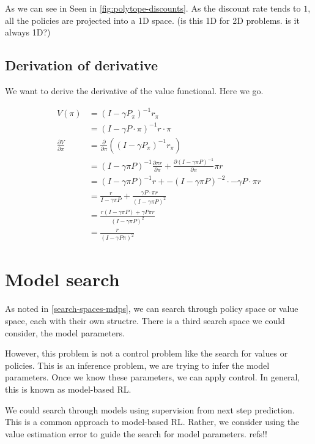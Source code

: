 As we can see in Seen in \ref{fig:polytope-discounts}. As the discount rate tends to $1$,
all the policies are projected into a 1D space. (is this 1D for 2D problems. is it always 1D?)

\subsection{Derivation of derivative}

We want to derive the derivative of the value functional. Here we go.

\begin{align*}
V(\pi) &= (I − \gamma P_{\pi})^{−1}r_{\pi} \tag{value functional}\\
&= (I − \gamma P\cdot \pi)^{−1}r\cdot \pi \\
\frac{\partial V}{\partial \pi} &= \frac{\partial}{\partial \pi}((I-\gamma P_{\pi})^{-1} r_{\pi}) \\
&= (I-\gamma \pi P)^{-1} \frac{\partial \pi r}{\partial \pi}+   \frac{\partial (I-\gamma \pi P)^{-1}}{\partial \pi}\pi r\tag{product rule} \\
&= (I-\gamma \pi P)^{-1} r + -(I-\gamma \pi P)^{-2} \cdot -\gamma P\cdot \pi r\\
&= \frac{r}{I-\gamma \pi P} + \frac{ \gamma P\cdot \pi r}{(I-\gamma \pi P)^2} \tag{rewrite as fractions}\\
&= \frac{r(I-\gamma \pi P) + \gamma P \pi r}{(I-\gamma \pi P)^2} \tag{common demoninator}\\
& = \frac{r}{(I-\gamma P \pi)^2} \tag{cancel}
\end{align*}

\newpage
\section{Model search} \label{model-iteration}

As noted in \ref{search-spaces-mdps}, we can search through policy space or value
space, each with their own structre.
There is a third search space we could consider, the model parameters.

However, this problem is not a control problem like the search for values or policies.
This is an inference problem, we are trying to infer the model parameters.
Once we know these parameters, we can apply control.
In general, this is known as model-based RL.

We could search through models using supervision from next step prediction.
This is a common approach to model-based RL. Rather, we consider using the value estimation error
to guide the search for model parameters. {\color{red}refs!!}

